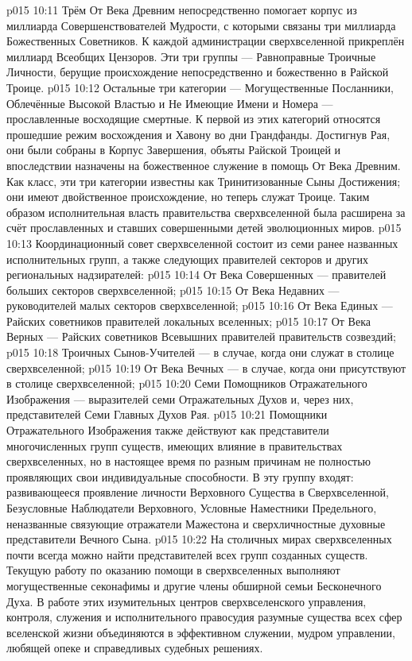 \vs p015 10:11 \pc Трём От Века Древним непосредственно помогает корпус из миллиарда Совершенствователей Мудрости, с которыми связаны три миллиарда Божественных Советников. К каждой администрации сверхвселенной прикреплён миллиард Всеобщих Цензоров. Эти три группы --- Равноправные Троичные Личности, берущие происхождение непосредственно и божественно в Райской Троице.
\vs p015 10:12 Остальные три категории --- Могущественные Посланники, Облечённые Высокой Властью и Не Имеющие Имени и Номера --- прославленные восходящие смертные. К первой из этих категорий относятся прошедшие режим восхождения и Хавону во дни Грандфанды. Достигнув Рая, они были собраны в Корпус Завершения, объяты Райской Троицей и впоследствии назначены на божественное служение в помощь От Века Древним. Как класс, эти три категории известны как Тринитизованные Сыны Достижения; они имеют двойственное происхождение, но теперь служат Троице. Таким образом исполнительная власть правительства сверхвселенной была расширена за счёт прославленных и ставших совершенными детей эволюционных миров.
\vs p015 10:13 Координационный совет сверхвселенной состоит из семи ранее названных исполнительных групп, а также следующих правителей секторов и других региональных надзирателей:
\vs p015 10:14 От Века Совершенных --- правителей больших секторов сверхвселенной;
\vs p015 10:15 От Века Недавних --- руководителей малых секторов сверхвселенной;
\vs p015 10:16 От Века Единых --- Райских советников правителей локальных вселенных;
\vs p015 10:17 От Века Верных --- Райских советников Всевышних правителей правительств созвездий;
\vs p015 10:18 Троичных Сынов\hyp{}Учителей --- в случае, когда они служат в столице сверхвселенной;
\vs p015 10:19 От Века Вечных --- в случае, когда они присутствуют в столице сверхвселенной;
\vs p015 10:20 Семи Помощников Отражательного Изображения --- выразителей семи Отражательных Духов и, через них, представителей Семи Главных Духов Рая.
\vs p015 10:21 \pc Помощники Отражательного Изображения также действуют как представители многочисленных групп существ, имеющих влияние в правительствах сверхвселенных, но в настоящее время по разным причинам не полностью проявляющих свои индивидуальные способности. В эту группу входят: развивающееся проявление личности Верховного Существа в Сверхвселенной, Безусловные Наблюдатели Верховного, Условные Наместники Предельного, неназванные связующие отражатели Мажестона и сверхличностные духовные представители Вечного Сына.
\vs p015 10:22 \pc На столичных мирах сверхвселенных почти всегда можно найти представителей всех групп созданных существ. Текущую работу по оказанию помощи в сверхвселенных выполняют могущественные секонафимы и другие члены обширной семьи Бесконечного Духа. В работе этих изумительных центров сверхвселенского управления, контроля, служения и исполнительного правосудия разумные существа всех сфер вселенской жизни объединяются в эффективном служении, мудром управлении, любящей опеке и справедливых судебных решениях.
